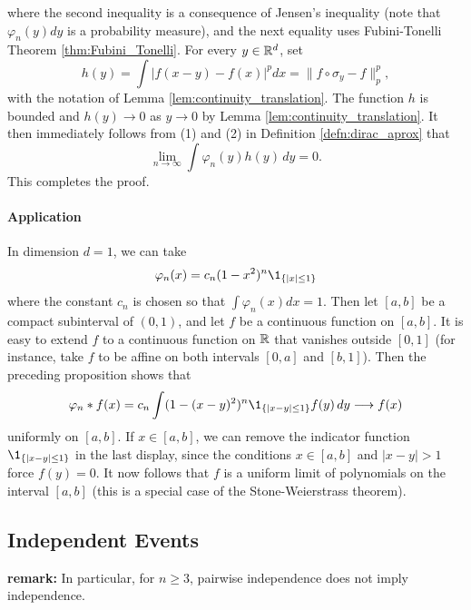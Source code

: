 \documentclass[../Main.tex]{subfiles}
\begin{document}
{\begin{enumerate}
where the second inequality is a consequence of Jensen's inequality (note that $\varphi_n(y)dy$ is a probability measure), and the next equality uses Fubini-Tonelli Theorem \ref{thm:Fubini_Tonelli}. For every $y \in \mathbb{R}^d$, set
\[ h(y) = \int |f(x-y)-f(x)|^p dx = \|f \circ \sigma_y - f\|_p^p, \]
with the notation of Lemma \ref{lem:continuity_translation}. The function $h$ is bounded and $h(y) \to 0$ as $y \to 0$ by Lemma \ref{lem:continuity_translation}. It then immediately follows from (1) and (2) in Definition \ref{defn:dirac_aprox} that
\[ \lim_{n \to \infty} \int \varphi_n(y)h(y)\,dy = 0. \]
This completes the proof.
\end{enumerate}

}

\paragraph{Application}
In dimension $d = 1$, we can take
\[
\varphi_n(x) = c_n(1 - x^2)^n \1_{\{|x|\leq 1\}}
\]
where the constant $c_n$ is chosen so that $\int \varphi_n(x)dx = 1$. Then let $[a,b]$ be a compact subinterval of $(0,1)$, and let $f$ be a continuous function on $[a,b]$. It is easy to extend $f$ to a continuous function on $\mathbb{R}$ that vanishes outside $[0,1]$ (for instance, take $f$ to be affine on both intervals $[0,a]$ and $[b,1]$). Then the preceding proposition shows that
\[
\varphi_n * f(x)
= c_n \int (1-(x-y)^2)^n \1_{\{|x-y|\leq 1\}} f(y)\,dy
\longrightarrow f(x)
\]
uniformly on $[a,b]$. If $x \in [a,b]$, we can remove the indicator function $\1_{\{|x-y|\leq 1\}}$ in the last display, since the conditions $x \in [a,b]$ and $|x-y|>1$ force $f(y)=0$. It now follows that $f$ is a uniform limit of polynomials on the interval $[a,b]$ (this is a special case of the Stone-Weierstrass theorem).



\subsection{Independent Events}

\textbf{remark:} In particular, for $n\ge3$, pairwise independence does not imply independence.
\end{document}
